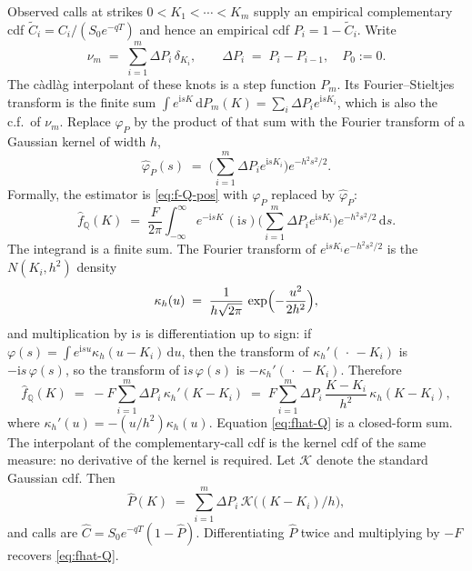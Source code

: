 \documentclass[preprint,12pt,authoryear,times]{elsarticle}
\newcommand{\Q}{\mathbb{Q}}
\begin{document}
Observed calls at strikes \(0<K_1<\cdots<K_m\) supply an empirical complementary cdf \(\tilde C_i=C_i/(S_0e^{-qT})\) and hence an empirical cdf \(P_i=1-\tilde C_i\). Write
\begin{equation}
\label{eq:nu}
\nu_m
\;=\;
\sum_{i=1}^m\Delta P_i\,\delta_{K_i},
\qquad
\Delta P_i
\;=\;
P_i-P_{i-1},
\quad
P_0:=0.
\end{equation}
The c\`adl\`ag interpolant of these knots is a step function \(P_m\). Its Fourier--Stieltjes transform is the finite sum \(\int e^{\mathrm{i}s K}\,\mathrm{d}P_m(K)=\sum_i\Delta P_i e^{\mathrm{i}s K_i}\), which is also the c.f.\ of \(\nu_m\). Replace \(\varphi_P\) by the product of that sum with the Fourier transform of a Gaussian kernel of width \(h\),
\begin{equation}
\label{eq:phi-hat}
\hat\varphi_P(s)
\;=\;
\Biggl(\sum_{i=1}^m\Delta P_i e^{\mathrm{i}s K_i}\Biggr)e^{-h^2 s^2/2}.
\end{equation}
Formally, the estimator is \eqref{eq:f-Q-pos} with \(\varphi_P\) replaced by \(\hat\varphi_P\):
\begin{equation}
\label{eq:fhat-Q-ft}
\hat f_{\Q}(K)
\;=\;
\frac{F}{2\pi}\int_{-\infty}^{\infty}e^{-\mathrm{i}s K}\,(\mathrm{i}s)\Biggl(\sum_{i=1}^m\Delta P_i e^{\mathrm{i}s K_i}\Biggr)e^{-h^2 s^2/2}\,\mathrm{d}s.
\end{equation}
The integrand is a finite sum. The Fourier transform of \(e^{\mathrm{i}s K_i}e^{-h^2 s^2/2}\) is the \(N(K_i,h^2)\) density
\begin{equation}
\label{eq:kappa}
\kappa_h(u)
\;=\;
\frac{1}{h\sqrt{2\pi}}\,\exp\Bigl(-\frac{u^2}{2h^2}\Bigr),
\end{equation}
and multiplication by \(\mathrm{i}s\) is differentiation up to sign: if \(\varphi(s)=\int e^{\mathrm{i}s u}\kappa_h(u-K_i)\,\mathrm{d}u\), then the transform of \(\kappa_h'(\,\cdot\,-K_i)\) is \(-\mathrm{i}s\,\varphi(s)\), so the transform of \(\mathrm{i}s\,\varphi(s)\) is \(-\kappa_h'(\,\cdot\,-K_i)\). Therefore
\begin{equation}
\label{eq:fhat-Q}
\hat f_{\Q}(K)
\;=\;
-F\sum_{i=1}^m\Delta P_i\,\kappa_h'(K-K_i)
\;=\;
F\sum_{i=1}^m\Delta P_i\,\frac{K-K_i}{h^2}\,\kappa_h(K-K_i),
\end{equation}
where \(\kappa_h'(u)=-(u/h^2)\kappa_h(u)\). Equation \eqref{eq:fhat-Q} is a closed-form sum. 
The interpolant of the complementary-call cdf is the kernel cdf of the same measure: no derivative of the kernel is required. Let \(\mathcal{K}\) denote the standard Gaussian cdf. Then
\begin{equation}
\label{eq:P-hat}
\hat P(K)
\;=\;
\sum_{i=1}^m\Delta P_i\,\mathcal{K}\bigl((K-K_i)/h\bigr),
\end{equation}
and calls are \(\hat C=S_0e^{-qT}(1-\hat P)\). Differentiating \(\hat P\) twice and multiplying by \(-F\) recovers \eqref{eq:fhat-Q}.
\label{sec:closed}
\end{document}

